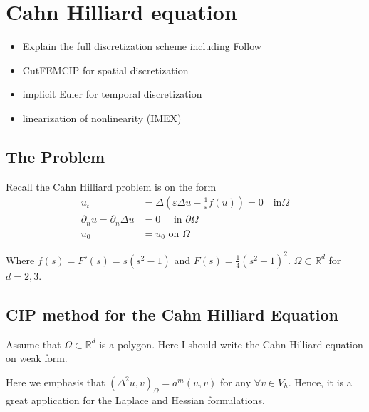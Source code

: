 
\newpage
\section{Cahn Hilliard equation }%
\label{sec:cahn_hilliard_equation}


\begin{itemize}
    \item Explain the full discretization scheme including Follow \cite{feng2007fully}
    \item CutFEMCIP for spatial discretization
    \item implicit Euler for temporal discretization
    \item linearization of nonlinearity (IMEX)
\end{itemize}


\subsection{The Problem}%
\label{sub:the_problem}

Recall the Cahn Hilliard problem is on the form
\begin{equation}
\label{eq:ch_exact}
    \begin{split}
        u_{t} & = \Delta ( \varepsilon  \Delta u - \frac{1}{\varepsilon } f( u) ) = 0 \quad \text{in} \Omega \\
        \partial _{n} u = \partial _{n} \Delta u & = 0 \quad \text{ in } \partial \Omega \\
        u_{0} & = u_{0}   \text{ on } \Omega
    \end{split}
\end{equation}

Where $f( s)  = F' ( s)=s( s^2 -1)  $ and $F( s)  = \frac{1}{4} ( s^2 - 1)^2 $. $\Omega \subset \mathbb{R} ^{d} $  for $d = 2,3$.



\subsection{ CIP method for the Cahn Hilliard Equation}%
\label{sub:writing_the_cahn_hilliard_equation_of_weak_form}

Assume that $\Omega  \subset \mathbb{R} ^{d}$ is a polygon.
Here I should write the Cahn Hilliard equation on weak form.

Here we emphasis that $( \Delta ^2 u, v)_\Omega  = a^{m}( u,v)   $ for any $\forall v \in V_{h}$.
Hence, it is a great application for the Laplace and Hessian formulations.

